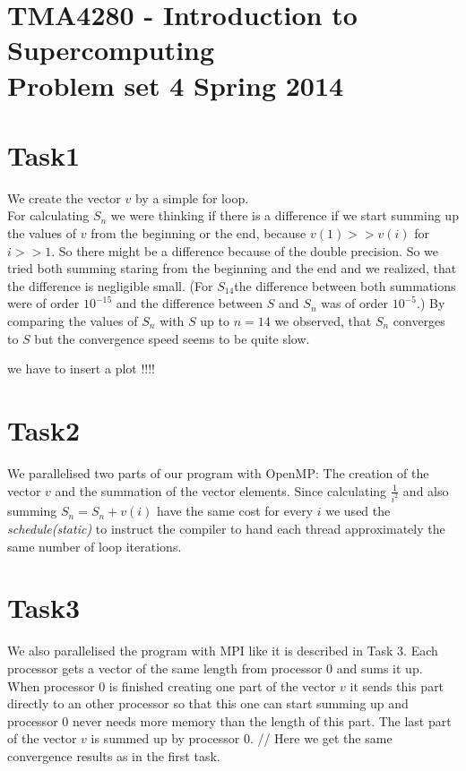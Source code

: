 \documentclass[11pt,titlepage] {article}
\begin{document}
 
\section*{TMA4280 - Introduction to Supercomputing\\ Problem set 4  Spring 2014}


\section{Task1}
We create the vector $v$ by a simple for loop. \\
For calculating $S_n$ we were thinking if there is a difference if we start summing up the values of $v$ from the beginning or the end, because $v(1)>>v(i)$ for $i>>1$. So there might be a difference because of the double precision. So we tried both summing staring from the beginning and the end and we realized, that the difference is negligible small. (For $S_{14}$the difference between both summations were of order $10^{-15}$ and the difference between $S$ and $S_n$ was of order $10^{-5}$.)
By comparing the values of $S_n$ with $S$ up to $n=14$ we observed, that $S_n$ converges to $S$ but the convergence speed seems to be quite slow.

we have to insert a plot !!!! 

\section{Task2}
 We parallelised two parts of our program with OpenMP: The creation of the vector $v$ and the summation of the vector elements. Since calculating $\frac{1}{i^2}$ and also summing $S_n=S_n+v(i)$ 
have the same cost for every $i$ we used the \textit{schedule(static)} to instruct the compiler to hand each thread approximately the same number of loop iterations.

\section{Task3}
We also parallelised the program with MPI like it is described in Task 3. Each processor gets a vector of the same length from processor $0$ and sums it up. When processor $0$ is finished creating one part of the vector $v$ it sends this part directly to an other processor so that this one can start summing up and processor $0$ never needs more memory than the length of this part. The last part of the vector $v$ is summed up by processor $0$. //
Here we get the same convergence results as in the first task. 
\end{document}
